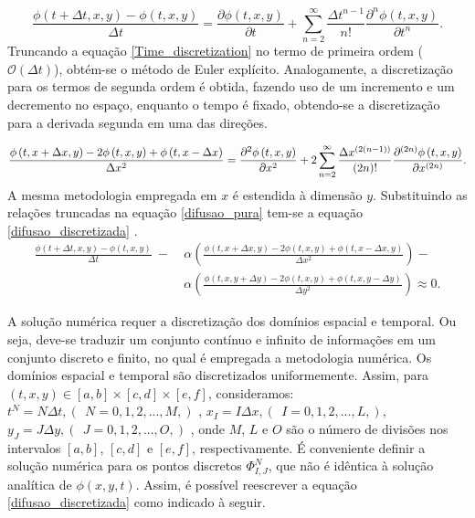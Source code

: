 \documentclass[a0,portrait]{a0poster}
\begin{document}
\begin{minipage}[c]{\linewidth}
\begin{framed}
\begin{multicols}{2}
\begin{equation} \label{Time_discretization}
\frac{\phi \left(t+\Delta t, x, y \right)-\phi \left(t, x, y\right)}{\Delta t}= \frac{\partial \phi \left(t, x, y\right)}{\partial t} + \sum\limits_{n=2}^{\infty} \frac{\Delta t^{n-1}}{n!} \frac{\partial^{n} \phi\left(t, x, y\right)}{\partial t^{n}}.
\end{equation}
Truncando a equação \ref{Time_discretization} no termo de primeira ordem ($\mathcal{O}(\Delta t)$), obtém-se o método de Euler explícito.
Analogamente, a discretização para os termos de segunda ordem é obtida, fazendo uso de um incremento e um decremento no espaço, enquanto o tempo é fixado, obtendo-se a discretização para a derivada segunda em uma das direções. 

\begin{equation} \label{Spacial_discretization3}
\frac{\phi \left(t, x+\Delta x, y\right)-2 \phi \left(t, x, y\right) + \phi \left(t, x-\Delta x\right)}{\Delta x^2} = \\
\frac{\partial^{2} \phi \left(t, x, y\right)}{\partial x^{2}}+ \\
2 \sum\limits_{n=2}^{\infty} \frac{ \Delta x^{\left(2\left(n-1\right)\right)}}{\left(2n\right)!} \frac{\partial^{\left(2n\right)} \phi \left(t, x, y\right)}{\partial x^{\left(2n\right)}}.
\end{equation}
A mesma metodologia empregada em $x$ é estendida à dimensão $y$.
Substituindo as relações truncadas na equação \ref{difusao_pura} tem-se a equação \ref{difusao_discretizada} .
\begin{equation} \label{difusao_discretizada}
\begin{split}
\frac{\phi \left(t+\Delta t, x, y\right)-\phi \left(t, x, y\right)}{\Delta t} \ - \ &\alpha \left( \frac{\phi \left(t, x+ \Delta x, y \right)-2 \phi \left(t, x, y \right) + \phi \left(t, x- \Delta x, y \right)}{\Delta x^2} \right) -\\
&\alpha \left( \frac{\phi \left(t, x, y+ \Delta y \right)-2 \phi \left(t, x, y \right) + \phi \left(t, x, y- \Delta y \right)}{\Delta y^2} \right) \approx 0 .%
\end{split}
\end{equation}


A solução numérica requer a discretização dos domínios espacial e temporal. Ou seja, deve-se traduzir um
conjunto contínuo e infinito de informações em um conjunto discreto e finito, no qual é empregada a metodologia numérica. Os domínios espacial e temporal são discretizados uniformemente. Assim, para $(t,x,y) \in [a,b] \times [c,d] \times [e,f]$, consideramos: $t^{N} = N \Delta t, (\ \ N=0,1,2,...,M,)$ , $x_{I} = I \Delta x,(\ \ I=0,1,2,...,L,)$, $y_{J} = J \Delta y, (\ \ J=0,1,2,...,O, )$ , onde $M$, $L$ e $O$ são o número de divisões nos intervalos $[a,b]$, $[c,d]$ e $[e,f]$, respectivamente.
É conveniente definir a solução numérica para os pontos discretos $\Phi_{I,J}^{N}$, que não é idêntica à solução analítica de $\phi (x,y,t)$. Assim, é possível reescrever a equação \ref{difusao_discretizada} como indicado à
seguir.


\end{multicols}
\end{framed}
\end{minipage}
\end{document}
